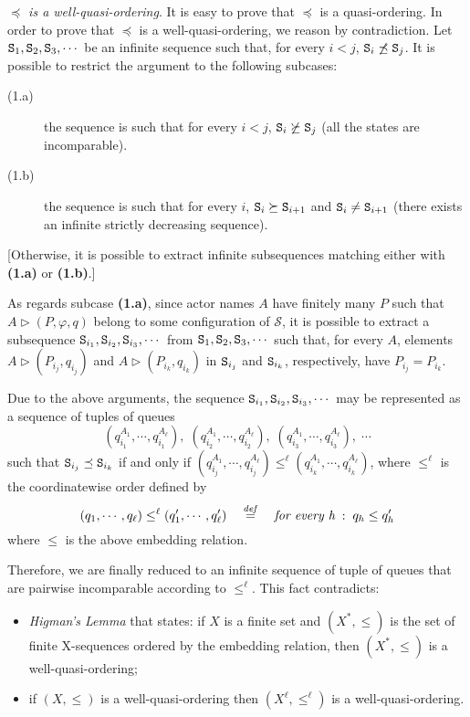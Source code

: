 \documentclass{LMCS}
\newcommand{\cal}{\mathcal}
\theoremstyle{plain}\newtheorem{proposition}[thm]{Proposition}
\theoremstyle{plain}\newtheorem{lemma}[thm]{Lemma}
\theoremstyle{plain}\newtheorem{theorem}[thm]{Theorem}
\theoremstyle{plain}\newtheorem{corollary}[thm]{Corollary}
\newif\ifconf \conffalse
\newcommand{\State}{{\tt S}}
\newcommand{\eqdef}{\stackrel{{\it def}}{=}}
\begin{document}
\ifconf
\else
{} \emph{$\preceq$ is a well-quasi-ordering}. It is easy to prove that 
$\preceq$ is a quasi-ordering.
In order to prove that $\preceq$ is a well-quasi-ordering, we reason by contradiction.
Let $\State_1, \State_2, \State_3, \cdots$ be 
an infinite sequence such that, for every $i < j$,  $\State_i \not \preceq 
\State_j$. It is possible to restrict the argument to the following subcases:
\begin{description}
\item[(1.a)] 
the sequence is such that for every $i < j$,  $\State_i \not \succeq
\State_j$ (all the states are incomparable).
\item[(1.b)] 
the sequence is such that for every $i$,  $\State_i \succeq \State_{i+1}$ and 
$\State_i \neq \State_{i+1}$ (there exists an infinite strictly decreasing sequence).
\end{description}
[Otherwise, it is possible to extract infinite subsequences matching either with 
{\bf (1.a)} or {\bf (1.b)}.]

As regards subcase {\bf (1.a)}, since actor names $A$ have finitely
many $P$ such that $A \triangleright (P,\varphi, q)$ belong to some configuration of ${\cal S}$,
it is possible to extract 
a subsequence $\State_{i_1}, \State_{i_2}, \State_{i_3}, \cdots$ from 
$\State_1, \State_2, \State_3, \cdots$ such that, for every $A$, elements $A \triangleright (P_{i_j}, q_{i_j})$ and $A \triangleright (P_{i_k}, q_{i_k})$
in $\State_{i_j}$ and $\State_{i_k}$, respectively, have $P_{i_j} =
P_{i_k}$.

Due to the above arguments, the sequence $\State_{i_1}, \State_{i_2}, 
\State_{i_3}, \cdots$ may be represented as a sequence of tuples of 
queues 
\[
(q_{i_1}^{A_1}, \cdots , q_{i_1}^{A_\ell}), \;
(q_{i_2}^{A_1}, \cdots , q_{i_2}^{A_\ell}),\;
(q_{i_3}^{A_1}, \cdots , q_{i_3}^{A_\ell}),\; \cdots
\]
such that $\State_{i_j} \preceq \State_{i_k}$ if and only if 
$(q_{i_j}^{A_1}, \cdots , q_{i_j}^{A_\ell}) \leq^\ell
(q_{i_k}^{A_1}, \cdots , q_{i_k}^{A_\ell})$, where $\leq^\ell$ is the 
coordinatewise order defined by
\[
(q_1, \cdots , q_\ell) \leq^\ell
(q_1', \cdots , q_\ell') \quad \eqdef \quad 
\mbox{{\em for every h}} \; : \; q_h \leq q_h'
\]
where $\leq$ is the above embedding relation.

Therefore, we are finally reduced to an infinite sequence of tuple of queues 
that are pairwise incomparable according to $\leq^\ell$. This fact contradicts:
\begin{itemize}
\item 
\emph{Higman's Lemma} \cite{HigmanLemma} that states: if $X$ is a finite set and $(X^*, \le)$ is the set of finite X-sequences ordered by the embedding 
relation, then $(X^*, \leq)$ is a  well-quasi-ordering;

\item 
if $(X,\leq)$ is a well-quasi-ordering then $(X^\ell, \leq^\ell)$ is a well-quasi-ordering.
\end{itemize}
\end{document}
